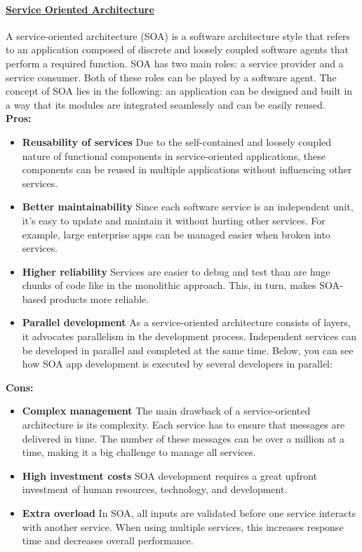 \documentclass[10pt,a4paper]{article}
\begin{document}
\paragraph{\uline{Service Oriented Architecture}} 
A service-oriented architecture (SOA) is a software architecture style that refers to an application composed of discrete and loosely coupled software agents that perform a required function. SOA has two main roles: a service provider and a service consumer. Both of these roles can be played by a software agent. The concept of SOA lies in the following: an application can be designed and built in a way that its modules are integrated seamlessly and can be easily reused.\\
\textbf{Pros:}
\begin{itemize}
		\item \textbf{Reusability of services}
Due to the self-contained and loosely coupled nature of functional components in service-oriented applications, these components can be reused in multiple applications without influencing other services.
	\item \textbf{Better maintainability}
Since each software service is an independent unit, it’s easy to update and maintain it without hurting other services. For example, large enterprise apps can be managed easier when broken into services.
	\item \textbf{Higher reliability}
Services are easier to debug and test than are huge chunks of code like in the monolithic approach. This, in turn, makes SOA-based products more reliable.
	\item \textbf{Parallel development}
As a service-oriented architecture consists of layers, it advocates parallelism in the development process. Independent services can be developed in parallel and completed at the same time. Below, you can see how SOA app development is executed by several developers in parallel:
\end{itemize}
\textbf{Cons:}
\begin{itemize}
	\item \textbf{Complex management}
The main drawback of a service-oriented architecture is its complexity. Each service has to ensure that messages are delivered in time. The number of these messages can be over a million at a time, making it a big challenge to manage all services.
	\item \textbf{High investment costs}
SOA development requires a great upfront investment of human resources, technology, and development.
	\item \textbf{Extra overload}
In SOA, all inputs are validated before one service interacts with another service. When using multiple services, this increases response time and decreases overall performance.
\end{itemize}
\end{document}
